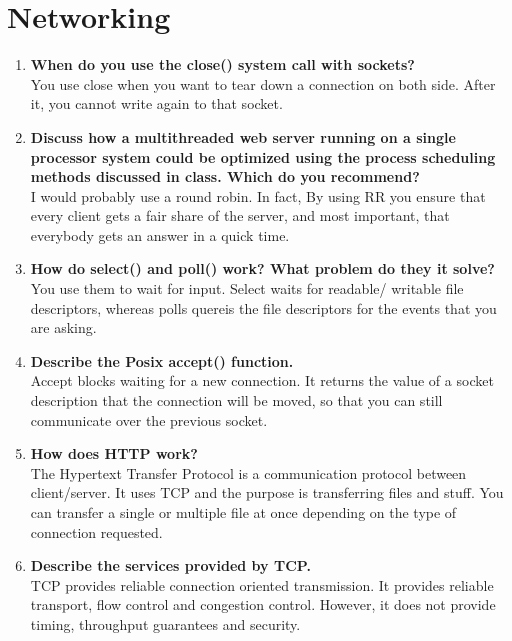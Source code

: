 \documentclass[a4paper]{article}
\begin{document}
\section{Networking} %
\label{sec:Networking}
\begin{enumerate}
  \item {\bf When do you use the close() system call with sockets? } \\
    You use close when you want to tear down a connection on both side. After it, you cannot write again to that socket.

  \item {\bf Discuss how a multithreaded web server running on a single processor system could be optimized using the process scheduling methods discussed in class. Which do you recommend? }\\
    I would probably use a round robin. In fact, By using RR you ensure that every client gets a fair share of the server, and most important, that everybody gets an answer in a quick time.

  \item {\bf How do select() and poll() work? What problem do they it solve? } \\
    You use them to wait for input. Select waits for readable/ writable file descriptors, whereas polls quereis the file descriptors for  the events that you are asking.

  \item {\bf Describe the Posix accept() function. } \\
    Accept blocks waiting for a new connection. It returns the value of a socket description that the connection will be moved, so that you can still communicate over the previous socket.

  \item {\bf How does HTTP work? } \\
    The Hypertext Transfer Protocol is a communication protocol between client/server. It uses TCP and the purpose is transferring files and stuff. You can transfer a single or multiple file at once  depending on the type of connection requested.

  \item {\bf Describe the services provided by TCP.} \\
    TCP provides reliable connection oriented transmission. It provides reliable transport, flow control and congestion control. However, it does not provide timing, throughput guarantees and security.
    

\end{enumerate}
\end{document}

